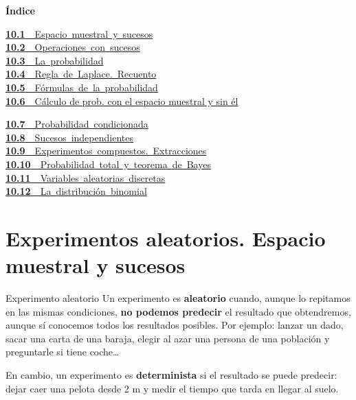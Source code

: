 \documentclass[11pt,a4paper]{article}
\begin{document}
\begin{tcolorbox}[colback=fmsurface,colframe=fmsurface,arc=3mm,left=4mm,right=4mm,top=2mm,bottom=2mm]
\small\textbf{Índice}\par\smallskip
\begin{minipage}[t]{0.49\linewidth}\small \mbox{\hyperlink{sec1}{\textbf{\color{fmgreen}10.1}\ \ Espacio muestral y sucesos}}\\[3pt]
\mbox{\hyperlink{sec2}{\textbf{\color{fmgreen}10.2}\ \ Operaciones con sucesos}}\\[3pt]
\mbox{\hyperlink{sec3}{\textbf{\color{fmgreen}10.3}\ \ La probabilidad}}\\[3pt]
\mbox{\hyperlink{sec4}{\textbf{\color{fmgreen}10.4}\ \ Regla de Laplace. Recuento}}\\[3pt]
\mbox{\hyperlink{sec5}{\textbf{\color{fmgreen}10.5}\ \ Fórmulas de la probabilidad}}\\[3pt]
\hyperlink{sec6}{\textbf{\color{fmgreen}10.6}\ \ Cálculo de prob. con el espacio muestral y sin él}\\[3pt]\end{minipage}\hfill\begin{minipage}[t]{0.49\linewidth}\small \mbox{\hyperlink{sec7}{\textbf{\color{fmgreen}10.7}\ \ Probabilidad condicionada}}\\[3pt]
\mbox{\hyperlink{sec8}{\textbf{\color{fmgreen}10.8}\ \ Sucesos independientes}}\\[3pt]
\mbox{\hyperlink{sec9}{\textbf{\color{fmgreen}10.9}\ \ Experimentos compuestos. Extracciones}}\\[3pt]
\mbox{\hyperlink{sec10}{\textbf{\color{fmgreen}10.10}\ \ Probabilidad total y teorema de Bayes}}\\[3pt]
\mbox{\hyperlink{sec11}{\textbf{\color{fmgreen}10.11}\ \ Variables aleatorias discretas}}\\[3pt]
\mbox{\hyperlink{sec12}{\textbf{\color{fmgreen}10.12}\ \ La distribución binomial}}\\[3pt]\end{minipage}
\end{tcolorbox}

\section{Experimentos aleatorios. Espacio muestral y sucesos}\hypertarget{sec1}{}

\begin{fmdef}{Experimento aleatorio}
Un experimento es \textbf{aleatorio} cuando, aunque lo repitamos en las mismas condiciones, \textbf{no podemos predecir} el resultado que obtendremos, aunque sí conocemos todos los resultados posibles. Por ejemplo: lanzar un dado, sacar una carta de una baraja, elegir al azar una persona de una población y preguntarle si tiene coche\dots{}

En cambio, un experimento es \textbf{determinista} si el resultado se puede predecir: dejar caer una pelota desde 2 m y medir el tiempo que tarda en llegar al suelo.
\end{fmdef}
\end{document}
